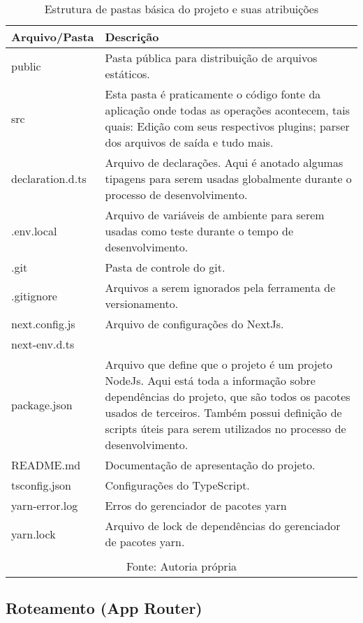 \begin{table}[H]
    \centering
    \caption{Estrutura de pastas básica do projeto e suas atribuições}
    \label{tbl:pastas-projeto}
    \renewcommand{\arraystretch}{1.5}
    \begin{tabular}{p{3.2000cm} p{12.8000cm}}
        \hline
        \textbf{Arquivo/Pasta} & \textbf{Descrição} \\
        \hline
        public & Pasta pública para distribuição de arquivos estáticos. \\
		src & Esta pasta é praticamente
            o código fonte da aplicação onde todas as operações acontecem, tais
            quais: Edição com seus respectivos plugins; parser dos arquivos de
            saída e tudo mais.
         \\
		declaration.d.ts & Arquivo de declarações. Aqui é anotado algumas tipagens para serem usadas
            globalmente durante o processo de desenvolvimento.
         \\
		.env.local & Arquivo de variáveis de ambiente para serem usadas como teste durante                o tempo de desenvolvimento. \\
		.git & Pasta de controle do git. \\
		.gitignore & Arquivos a serem ignorados pela ferramenta de versionamento. \\
		next.config.js & Arquivo de configurações do NextJs. \\
		next-env.d.ts &  \\
		package.json & Arquivo que define que o projeto é um projeto NodeJs. Aqui está toda a informação sobre dependências
            do projeto, que são todos os pacotes usados de terceiros. Também possui definição
            de scripts úteis para serem utilizados no processo de desenvolvimento.
         \\
		README.md & Documentação de apresentação do projeto. \\
		tsconfig.json & Configurações do TypeScript. \\
		yarn-error.log & Erros do gerenciador de pacotes yarn \\
		yarn.lock & Arquivo de lock de dependências do gerenciador de pacotes yarn. \\
        \hline
        \\\multicolumn{2}{c}{\fontsize{10pt}{12pt}Fonte: Autoria própria}
    \end{tabular}
\end{table}

\subsection{Roteamento (App Router)}

